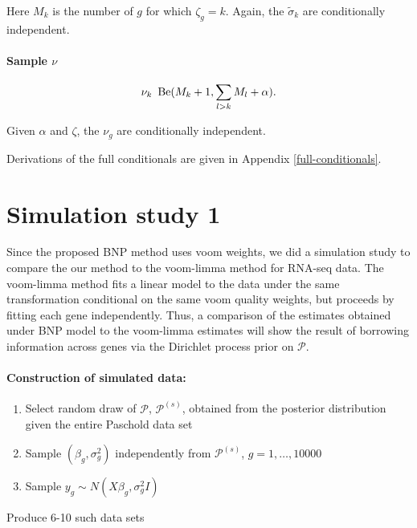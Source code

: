     Here $M_k$ is the number of $g$ for which $\zeta_g = k$. Again, the $\tilde{\sigma}_k$ are conditionally independent.

\paragraph{Sample $\nu$}
\begin{equation*}
\nu_k ~ \operatorname{Be}(M_k + 1, \sum_{l>k}M_l + \alpha).
\end{equation*}

Given $\alpha$ and $\zeta$, the $\nu_g$ are conditionally independent.

Derivations of the full conditionals are given in Appendix \ref{full-conditionals}.

\section{Simulation study 1}
Since the proposed BNP method uses voom weights, we did a simulation study to compare the our method to the voom-limma method for RNA-seq data. The voom-limma method fits a linear model to the data under the same transformation conditional on the same voom quality weights, but proceeds by fitting each gene independently. Thus, a comparison of the estimates obtained under BNP model to the voom-limma estimates will show the result of borrowing information across genes via the Dirichlet process prior on $\mathcal{P}$.

\paragraph{Construction of simulated data:}
\begin{enumerate}
\item Select random draw of $\mathcal{P}$, $\mathcal{P}^{(s)}$, obtained from the posterior distribution given the entire Paschold data set

\item Sample $(\beta_g,\sigma^2_g)$ independently from $\mathcal{P}^{(s)}$, $g=1,\ldots,10000$ 

\item Sample $y_{g} \sim N(X\beta_g,\sigma^2_g I)$
\end{enumerate}
Produce 6-10 such data sets\\

